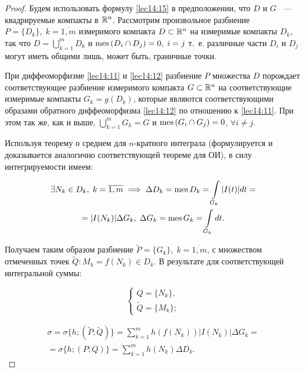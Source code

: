 \documentclass[../../main.tex]{subfiles}
\begin{document}
	
	\begin{proof}
		
	Будем использовать формулу \eqref{lec14:15} в предположении, что
	$D$ и $G$ ~--- квадрируемые компакты в $\mathbb{R}^n$. Рассмотрим произвольное 
	разбиение $P =
	\{ D_k \},\; k = \overline{1, m}$ измеримого компакта $D \subset 
	\mathbb{R}^n$ на измеримые компакты $D_k$, так что $D = \bigcup\limits_{k = 1}^{m} 
	D_k$ 
	и $\operatorname{mes}\left(D_i \cap D_j\right) = 0,\; i = j$ т.~е. различные части $D_i$ и 
	$D_j$ могут иметь общими лишь, может быть, граничные точки.
		   
	При диффеоморфизме \eqref{lec14:11} и \eqref{lec14:12} разбиение $P$ 
	множества $D$ порождает соответствующее разбиение измеримого компакта 
	$G \subset \mathbb{R}^n$ на соответствующие измеримые компакты
	$G_k = g(D_k)$, которые являются соответствующими образами обратного 
	диффеоморфизма 
	\eqref{lec14:12} по отношению к \eqref{lec14:11}. При этом так же, как и выше,
	$
	\bigcup\limits_{k = 1}^{m} G_k = G$ и $\operatorname{mes}\left(G_i \cap G_j\right) = 0$, 
	$\forall i \neq j$.
	
	Используя теорему о среднем для $n$-кратного интеграла (формулируется и 
	доказывается аналогично соответствующей теореме для ОИ), 
	в силу интегрируемости имеем:
	
	\[
	\begin{gathered}
	\exists N_k \in D_k,\; k = \overline{1, m} \implies \Delta D_k = \operatorname{mes} D_k 
	= \int\limits_{G_k} |I(t)| dt = \\ = |I(N_k)|
	 \Delta G_k,\; \Delta G_k = \operatorname{mes} G_k = \int\limits_{G_k} dt.
	\end{gathered}
	\]
	
	Получаем таким образом разбиение $\widetilde{P} = \{ G_k  \},\; 
	k = \overline{1, m}$, с множеством отмеченных точек $\widetilde{Q} : M_k = 
	f(N_k) 
	\in D_k$. В результате для соответствующей интегральной суммы:
	
	\[
	\begin{cases}
	Q = \{ N_k \},\\
	\widetilde{Q} = \{ M_k \};
	\end{cases}
	\]
	
	\begin{equation}
	\label{lec15:40}
	\begin{gathered}
	\sigma = \sigma \{ h; (\widetilde{P}; \widetilde{Q}) \} = \sum_{k = 1}^{m} h 
	\left( f \left( N_k \right) \right)|I(N_k)| \Delta G_k = \\ = 
	\sigma \{ h; \left( P; Q \right) \} = \sum_{k = 1}^{m} h 
	\left( N_k \right) \Delta D_k.
	\end{gathered}
	\end{equation}
	

\end{proof}
\end{document}
